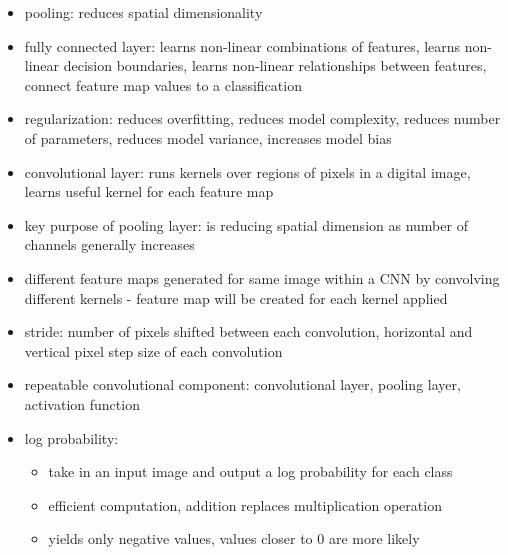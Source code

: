 \documentclass[10pt]{article}
\begin{document}
\begin{itemize}[label=\(\star\), leftmargin=1em, itemsep=-0.3em]
\begin{itemize}[label=\(\star\), leftmargin=1em, itemsep=-0.3em]
    \end{itemize}
    \item pooling: reduces spatial dimensionality
    \item fully connected layer: learns non-linear combinations of features, learns non-linear decision boundaries, learns non-linear relationships between features, connect feature map values to a classification
    \item regularization: reduces overfitting, reduces model complexity, reduces number of parameters, reduces model variance, increases model bias
    \item convolutional layer: runs kernels over regions of pixels in a digital image, learns useful kernel for each feature map
    \item key purpose of pooling layer: is reducing spatial dimension as number of channels generally increases
    \item different feature maps generated for same image within a CNN by convolving different kernels - feature map will be created for each kernel applied
    \item stride: number of pixels shifted between each convolution, horizontal and vertical pixel step size of each convolution
    \item repeatable convolutional component: convolutional layer, pooling layer, activation function
    \item log probability:
    \begin{itemize}[label=\(\star\), leftmargin=1em, itemsep=-0.3em]
        \item take in an input image and output a log probability for each class
        \item efficient computation, addition replaces multiplication operation
        \item yields only negative values, values closer to 0 are more likely
    \end{itemize}
\end{itemize}
\end{document}
